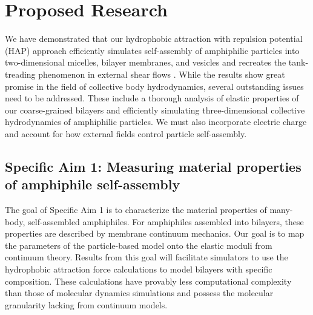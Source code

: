 \section{Proposed Research}
\label{sec:proposed-work}
We have demonstrated that our hydrophobic attraction with repulsion
potential (HAP) approach efficiently simulates self-assembly of
amphiphilic particles into two-dimensional micelles, bilayer membranes,
and vesicles \cite{Fu2018_SIAM} and recreates the tank-treading
phenomenon in external shear flows \cite{FuQuRyYo20}.
While the results show great promise in the field of collective body
hydrodynamics, several outstanding issues need to be addressed. These
include a thorough analysis of elastic properties of our coarse-grained
bilayers and efficiently simulating three-dimensional collective
hydrodynamics of amphiphilic particles.
We must also incorporate electric charge and account
for how external fields control particle self-assembly. 

\subsection{Specific Aim 1: Measuring material properties of amphiphile self-assembly}
\label{subsec:specific_aim_1}

The goal of Specific Aim 1 is to characterize the material properties of many-body, self-assembled amphiphiles.
For amphiphiles assembled into bilayers, these properties are described by membrane continuum mechanics.
Our goal is to map the parameters of the particle-based model onto the elastic moduli from continuum theory.
Results from this goal will facilitate simulators to use the hydrophobic attraction force calculations
to model bilayers with specific composition. These calculations have provably less computational complexity than
those of molecular dynamics simulations and possess the molecular granularity lacking from continuum models.

